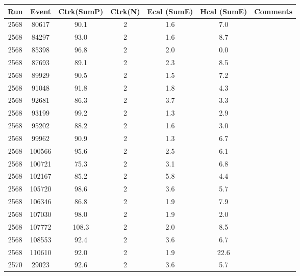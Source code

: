 \begin{tabular}{ccccccl}
	\toprule
	Run & Event & Ctrk(SumP) & Ctrk(N) & Ecal (SumE) & Hcal (SumE) & Comments \\
	\midrule
	2568 & 80617  & 90.1  & 2 & 1.6 & 7.0  &  \\ \midrule
	2568 & 84297  & 93.0  & 2 & 1.6 & 8.7  &  \\
	2568 & 85398  & 96.8  & 2 & 2.0 & 0.0  &  \\
	2568 & 87693  & 89.1  & 2 & 2.3 & 8.5  &  \\
	2568 & 89929  & 90.5  & 2 & 1.5 & 7.2  &  \\
	2568 & 91048  & 91.8  & 2 & 1.8 & 4.3  &  \\
	2568 & 92681  & 86.3  & 2 & 3.7 & 3.3  &  \\
	2568 & 93199  & 99.2  & 2 & 1.3 & 2.9  &  \\
	2568 & 95202  & 88.2  & 2 & 1.6 & 3.0  &  \\
	2568 & 99962  & 90.9  & 2 & 1.3 & 6.7  &  \\
	2568 & 100566 & 95.6  & 2 & 2.5 & 6.1  &  \\
	2568 & 100721 & 75.3  & 2 & 3.1 & 6.8  &  \\
	2568 & 102167 & 85.2  & 2 & 5.8 & 4.4  &  \\
	2568 & 105720 & 98.6  & 2 & 3.6 & 5.7  &  \\
	2568 & 106346 & 86.8  & 2 & 1.9 & 7.9  &  \\
	2568 & 107030 & 98.0  & 2 & 1.9 & 2.0  &  \\
	2568 & 107772 & 108.3 & 2 & 2.0 & 8.5  &  \\
	2568 & 108553 & 92.4  & 2 & 3.6 & 6.7  &  \\
	2568 & 110610 & 92.0  & 2 & 1.9 & 22.6 &  \\
	2570 & 29023  & 92.6  & 2 & 3.6 & 5.7  &  \\
	\bottomrule
\end{tabular}
